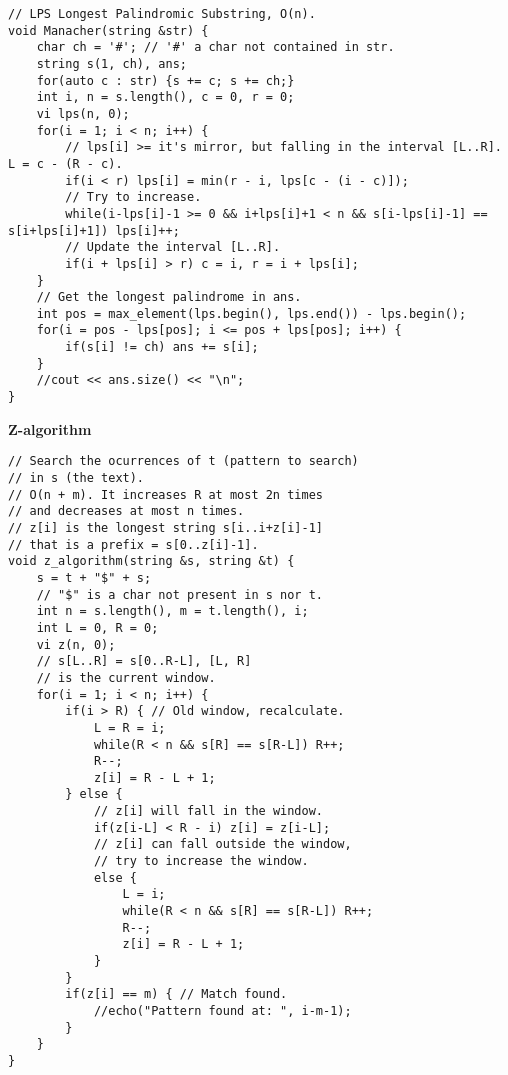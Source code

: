 \documentclass[a4paper,10pt]{article}
\newcommand{\titleAlg}[1]{\vspace{-10pt}
\begin{center}\textbf{#1}\end{center} \vspace{-10pt}}
\begin{document}
\begin{verbatim}
// LPS Longest Palindromic Substring, O(n).
void Manacher(string &str) {
    char ch = '#'; // '#' a char not contained in str.
    string s(1, ch), ans;
    for(auto c : str) {s += c; s += ch;}
    int i, n = s.length(), c = 0, r = 0;
    vi lps(n, 0);
    for(i = 1; i < n; i++) {
        // lps[i] >= it's mirror, but falling in the interval [L..R]. L = c - (R - c).
        if(i < r) lps[i] = min(r - i, lps[c - (i - c)]);
        // Try to increase.
        while(i-lps[i]-1 >= 0 && i+lps[i]+1 < n && s[i-lps[i]-1] == s[i+lps[i]+1]) lps[i]++;
        // Update the interval [L..R].
        if(i + lps[i] > r) c = i, r = i + lps[i];
    }
    // Get the longest palindrome in ans.
    int pos = max_element(lps.begin(), lps.end()) - lps.begin();
    for(i = pos - lps[pos]; i <= pos + lps[pos]; i++) {
        if(s[i] != ch) ans += s[i];
    }
    //cout << ans.size() << "\n";
}
\end{verbatim}
\vspace{-25pt}
\titleAlg{Z-algorithm}
\begin{multicols}{2}
\begin{verbatim}
// Search the ocurrences of t (pattern to search) 
// in s (the text).
// O(n + m). It increases R at most 2n times 
// and decreases at most n times. 
// z[i] is the longest string s[i..i+z[i]-1] 
// that is a prefix = s[0..z[i]-1].
void z_algorithm(string &s, string &t) {
    s = t + "$" + s; 
    // "$" is a char not present in s nor t.
    int n = s.length(), m = t.length(), i;
    int L = 0, R = 0;
    vi z(n, 0);
    // s[L..R] = s[0..R-L], [L, R] 
    // is the current window.
    for(i = 1; i < n; i++) {
        if(i > R) { // Old window, recalculate.
            L = R = i;
            while(R < n && s[R] == s[R-L]) R++;
            R--;
            z[i] = R - L + 1;
        } else {
            // z[i] will fall in the window.
            if(z[i-L] < R - i) z[i] = z[i-L]; 
            // z[i] can fall outside the window, 
            // try to increase the window.
            else { 
                L = i;
                while(R < n && s[R] == s[R-L]) R++;
                R--;
                z[i] = R - L + 1;
            }
        }
        if(z[i] == m) { // Match found.
            //echo("Pattern found at: ", i-m-1);
        }
    }
}
\end{verbatim}
\end{multicols}
\end{document}
